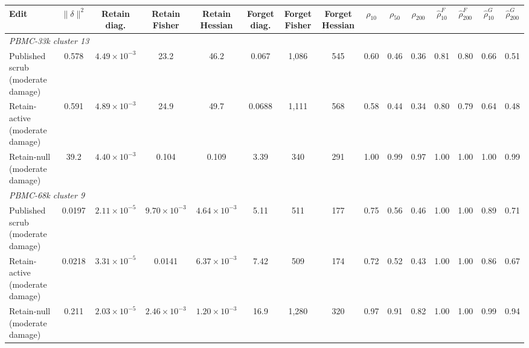 \begin{tabular}{lcccccccccccccc}
\toprule
Edit & $\|\delta\|^2$ & Retain diag. & Retain Fisher & Retain Hessian & Forget diag. & Forget Fisher & Forget Hessian & $\rho_{10}$ & $\rho_{50}$ & $\rho_{200}$ & $\hat\rho^{F}_{10}$ & $\hat\rho^{F}_{200}$ & $\hat\rho^{G}_{10}$ & $\hat\rho^{G}_{200}$ \\
\midrule
\multicolumn{15}{l}{\emph{PBMC-33k cluster 13}} \\
Published scrub (moderate damage) & 0.578 & $4.49 \times 10^{-3}$ & 23.2 & 46.2 & 0.067 & 1,086 & 545 & 0.60 & 0.46 & 0.36 & 0.81 & 0.80 & 0.66 & 0.51 \\
Retain-active (moderate damage) & 0.591 & $4.89 \times 10^{-3}$ & 24.9 & 49.7 & 0.0688 & 1,111 & 568 & 0.58 & 0.44 & 0.34 & 0.80 & 0.79 & 0.64 & 0.48 \\
Retain-null (moderate damage) & 39.2 & $4.40 \times 10^{-3}$ & 0.104 & 0.109 & 3.39 & 340 & 291 & 1.00 & 0.99 & 0.97 & 1.00 & 1.00 & 1.00 & 0.99 \\
\midrule
\multicolumn{15}{l}{\emph{PBMC-68k cluster 9}} \\
Published scrub (moderate damage) & 0.0197 & $2.11 \times 10^{-5}$ & $9.70 \times 10^{-3}$ & $4.64 \times 10^{-3}$ & 5.11 & 511 & 177 & 0.75 & 0.56 & 0.46 & 1.00 & 1.00 & 0.89 & 0.71 \\
Retain-active (moderate damage) & 0.0218 & $3.31 \times 10^{-5}$ & 0.0141 & $6.37 \times 10^{-3}$ & 7.42 & 509 & 174 & 0.72 & 0.52 & 0.43 & 1.00 & 1.00 & 0.86 & 0.67 \\
Retain-null (moderate damage) & 0.211 & $2.03 \times 10^{-5}$ & $2.46 \times 10^{-3}$ & $1.20 \times 10^{-3}$ & 16.9 & 1,280 & 320 & 0.97 & 0.91 & 0.82 & 1.00 & 1.00 & 0.99 & 0.94 \\
\bottomrule
\end{tabular}
